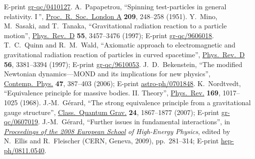 \documentclass[a4paper,showkeys,aps,prd,reprint,nofootinbib,showpacs,twocolumn]{revtex4-1}
\theoremstyle{plain}
\begin{document}
{\begin{thebibliography}{99}
E-print \href{http://arxiv.org/abs/gr-qc/0410127}{gr-qc/0410127}.
  A.~Papapetrou,
  ``Spinning test-particles in general relativity. I$\,$'', 
  \href{http://rspa.royalsocietypublishing.org/content/209/1097/248}{Proc.\ R.\ Soc.\ London A} {\bf 209}, 248--258 (1951).
  Y.~Mino, M.~Sasaki, and T.~Tanaka,
  ``Gravitational radiation reaction to a particle motion'', 
  \href{http://prd.aps.org/abstract/PRD/v55/i6/p3457_1}{Phys.\ Rev.\ D} {\bf 55}, 3457--3476 (1997);
  E-print \href{http://arxiv.org/abs/gr-qc/9606018}{gr-qc/9606018}.
T.~C.~Quinn and R.~M.~Wald,
``Axiomatic approach to electromagnetic and gravitational radiation reaction
of particles in curved spacetime'', 
\href{http://prd.aps.org/abstract/PRD/v56/i6/p3381_1}{Phys.~Rev.~D} {\bf 56}, 3381--3394 (1997);   
E-print \href{http://arxiv.org/abs/gr-qc/9610053}{gr-qc/9610053}.
J.~D.~Bekenstein, 
``The modified Newtonian dynamics---MOND and its implications for new physics'',
\href{http://dx.doi.org/10.1080/00107510701244055}{Contemp.~Phys.} {\bf 47}, 387--403 (2006);  
E-print \href{http://arxiv.org/abs/astro-ph/0701848}{astro-ph/0701848}.
  K.~Nordtvedt, 
  ``Equivalence principle for massive bodies.  II. Theory'', 
  \href{http://prola.aps.org/abstract/PR/v169/i5/p1017_1}{Phys.~Rev.} {\bf 169}, 1017--1025 (1968).
  J.-M.~G\'erard,
 ``The strong equivalence principle from a gravitational gauge structure'', 
  \href{http://iopscience.iop.org/0264-9381/24/7/012/}{Class.~Quantum Grav.} {\bf 24}, 1867--1877 (2007);   
  E-print \href{http://arxiv.org/abs/gr-qc/0607019}{gr-qc/0607019}.
  J.-M.~G\'erard, 
 ``Further issues in fundamental interactions'', 
  in \href{http://cds.cern.ch/record/1061245?ln=en}{\em Proceedings of the 2008 European School\/} {\em of High-Energy Physics}, 
  edited by N.~Ellis and R.~Fleischer 
  (CERN, Geneva, 2009), pp.~281--314; 
  E-print \href{http://arxiv.org/abs/0811.0540}{hep-ph/0811.0540}.

\end{thebibliography}}
\end{document}
